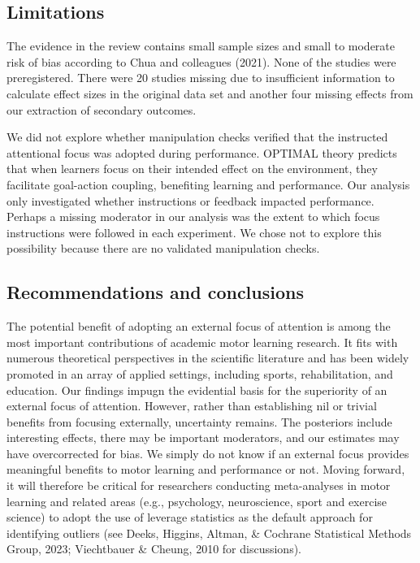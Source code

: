 \documentclass[
  man, donotrepeattitle,floatsintext]{apa7}
\begin{document}
\hypertarget{limitations}{%
\subsection{Limitations}\label{limitations}}

The evidence in the review contains small sample sizes and small to moderate risk of bias according to Chua and colleagues (2021). None of the studies were preregistered. There were 20 studies missing due to insufficient information to calculate effect sizes in the original data set and another four missing effects from our extraction of secondary outcomes.

We did not explore whether manipulation checks verified that the instructed attentional focus was adopted during performance. OPTIMAL theory predicts that when learners focus on their intended effect on the environment, they facilitate goal-action coupling, benefiting learning and performance. Our analysis only investigated whether instructions or feedback impacted performance. Perhaps a missing moderator in our analysis was the extent to which focus instructions were followed in each experiment. We chose not to explore this possibility because there are no validated manipulation checks.

\hypertarget{recommendations-and-conclusions}{%
\subsection{Recommendations and conclusions}\label{recommendations-and-conclusions}}

The potential benefit of adopting an external focus of attention is among the most important contributions of academic motor learning research. It fits with numerous theoretical perspectives in the scientific literature and has been widely promoted in an array of applied settings, including sports, rehabilitation, and education. Our findings impugn the evidential basis for the superiority of an external focus of attention. However, rather than establishing nil or trivial benefits from focusing externally, uncertainty remains. The posteriors include interesting effects, there may be important moderators, and our estimates may have overcorrected for bias. We simply do not know if an external focus provides meaningful benefits to motor learning and performance or not. Moving forward, it will therefore be critical for researchers conducting meta-analyses in motor learning and related areas (e.g., psychology, neuroscience, sport and exercise science) to adopt the use of leverage statistics as the default approach for identifying outliers (see Deeks, Higgins, Altman, \& Cochrane Statistical Methods Group, 2023; Viechtbauer \& Cheung, 2010 for discussions).
\end{document}
